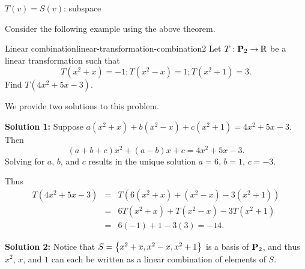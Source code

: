 $T(v) = S(v)$: subspace

Consider the following example using the above theorem.

\begin{example}{Linear combination}{linear-transformation-combination2}
  Let $T:\mathbf{P}_2 \to \mathbb{R}$ be a linear transformation such that
  \begin{equation*}
    T(x^2+x)=-1; T(x^2-x)=1; T(x^2+1)=3.
  \end{equation*}
  Find $T(4x^2+5x-3)$.
\end{example}

\begin{solution}
  We provide two solutions to this problem.

  \textbf{Solution 1:}
  Suppose $a(x^2+x) + b(x^2-x) + c(x^2+1) = 4x^2+5x-3$.  Then
  \begin{equation*} (a+b+c)x^2 + (a-b)x + c = 4x^2+5x-3.\end{equation*}
  Solving for $a$, $b$, and $c$ results in the unique solution
  $a=6$, $b=1$, $c=-3$.

  Thus
  \begin{eqnarray*}
    T(4x^2+5x-3)
    & = & T(6(x^2+x) + (x^2-x) -3(x^2+1)) \\
    & = & 6T(x^2+x) + T(x^2-x) -3T(x^2+1) \\
    & = & 6(-1) + 1 -3(3) = -14.
  \end{eqnarray*}

  \textbf{Solution 2:}
  Notice that $S=\left\{x^2+x, x^2-x, x^2+1\right\}$ is a basis of $\mathbf{P}_2$,
  and thus $x^2$, $x$, and $1$ can each be written as a linear
  combination of elements of $S$.


\end{solution}
